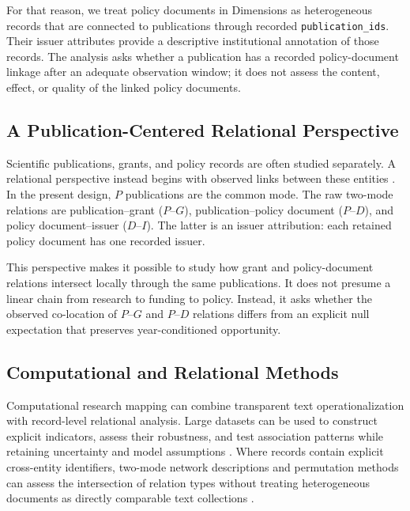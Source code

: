 \documentclass[12pt]{article}
\begin{document}
For that reason, we treat policy documents in Dimensions as heterogeneous records that are connected to publications through recorded \texttt{publication\_ids}. Their issuer attributes provide a descriptive institutional annotation of those records. The analysis asks whether a publication has a recorded policy-document linkage after an adequate observation window; it does not assess the content, effect, or quality of the linked policy documents.

\subsection{A Publication-Centered Relational Perspective}

Scientific publications, grants, and policy records are often studied separately. A relational perspective instead begins with observed links between these entities \citep{nag2013,gutirrezsnchez2025,almeida2006}. In the present design, $P$ publications are the common mode. The raw two-mode relations are publication--grant ($P$--$G$), publication--policy document ($P$--$D$), and policy document--issuer ($D$--$I$). The latter is an issuer attribution: each retained policy document has one recorded issuer.

This perspective makes it possible to study how grant and policy-document relations intersect locally through the same publications. It does not presume a linear chain from research to funding to policy. Instead, it asks whether the observed co-location of $P$--$G$ and $P$--$D$ relations differs from an explicit null expectation that preserves year-conditioned opportunity.

\subsection{Computational and Relational Methods}

Computational research mapping can combine transparent text operationalization with record-level relational analysis. Large datasets can be used to construct explicit indicators, assess their robustness, and test association patterns while retaining uncertainty and model assumptions \citep{khurana2023,zhang2025,rashid2019}. Where records contain explicit cross-entity identifiers, two-mode network descriptions and permutation methods can assess the intersection of relation types without treating heterogeneous documents as directly comparable text collections \citep{kortum2021,jose2025}.
\end{document}

